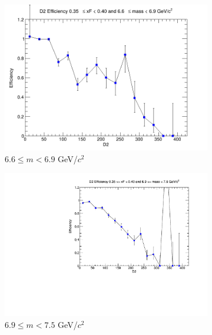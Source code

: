 \begin{figure}[p]
\begin{subfigure}[b]{0.32\textwidth}
        \includegraphics[width=\textwidth]{./kTrackerEfficiencyPlots/D2_Efficiency_xF7_mass8.png}
        \caption{$6.6 \leq m < 6.9$ GeV/$c^2$}
        \label{fig:xF7_mass8}
    \end{subfigure}
    \vspace{0.5cm}
    \begin{subfigure}[b]{0.32\textwidth}
        \centering
        \includegraphics[width=\textwidth]{./kTrackerEfficiencyPlots/D2_Efficiency_xF7_mass9.pdf}
        \caption{$6.9 \leq m < 7.5$ GeV/$c^2$}
        \label{fig:xF7_mass9}
    \end{subfigure}
    \hfill
    \begin{subfigure}[b]{0.32\textwidth}
        \centering

\end{subfigure}
\end{figure}
